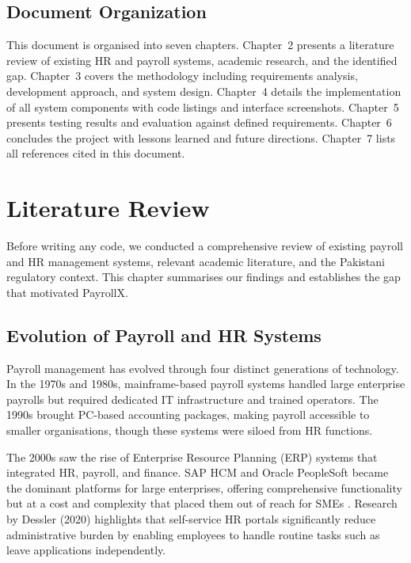 \documentclass[12pt,a4paper]{report}
\begin{document}
\section{Document Organization}

This document is organised into seven chapters. Chapter~2 presents a literature review of existing HR and payroll systems, academic research, and the identified gap. Chapter~3 covers the methodology including requirements analysis, development approach, and system design. Chapter~4 details the implementation of all system components with code listings and interface screenshots. Chapter~5 presents testing results and evaluation against defined requirements. Chapter~6 concludes the project with lessons learned and future directions. Chapter~7 lists all references cited in this document.

\chapter{Literature Review}
\label{chap:literature}

Before writing any code, we conducted a comprehensive review of existing payroll and HR management systems, relevant academic literature, and the Pakistani regulatory context. This chapter summarises our findings and establishes the gap that motivated PayrollX.

\section{Evolution of Payroll and HR Systems}

Payroll management has evolved through four distinct generations of technology. In the 1970s and 1980s, mainframe-based payroll systems handled large enterprise payrolls but required dedicated IT infrastructure and trained operators. The 1990s brought PC-based accounting packages, making payroll accessible to smaller organisations, though these systems were siloed from HR functions.

The 2000s saw the rise of Enterprise Resource Planning (ERP) systems that integrated HR, payroll, and finance. SAP HCM and Oracle PeopleSoft became the dominant platforms for large enterprises, offering comprehensive functionality but at a cost and complexity that placed them out of reach for SMEs \cite{BenAri2008}. Research by Dessler (2020) highlights that self-service HR portals significantly reduce administrative burden by enabling employees to handle routine tasks such as leave applications independently.
\end{document}
